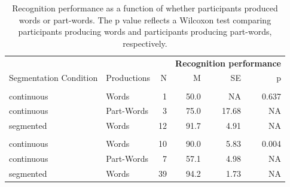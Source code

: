 \documentclass[
]{article}
\begin{document}
\begin{longtable}[t]{llrrrr}
\caption{\label{tab:correlation-recognition-vs-recall-discrete-print}Recognition performance as a function of whether participants produced words or part-words. The p value reflects a Wilcoxon test comparing participants producing words and participants producing part-words, respectively.}\\
\toprule
\multicolumn{3}{c}{\textbf{ }} & \multicolumn{3}{c}{\textbf{Recognition performance}} \\
\cmidrule(l{3pt}r{3pt}){4-6}
Segmentation Condition & Productions & N & M & SE & p\\
\midrule
\addlinespace[0.3em]
\multicolumn{6}{l}{\textbf{lab-based}}\\
\hspace{1em}continuous & Words & 1 & 50.0 & NA & 0.637\\
\hspace{1em}continuous & Part-Words & 3 & 75.0 & 17.68 & NA\\
\hspace{1em}segmented & Words & 12 & 91.7 & 4.91 & NA\\
\addlinespace[0.3em]
\multicolumn{6}{l}{\textbf{online}}\\
\hspace{1em}continuous & Words & 10 & 90.0 & 5.83 & 0.004\\
\hspace{1em}continuous & Part-Words & 7 & 57.1 & 4.98 & NA\\
\hspace{1em}segmented & Words & 39 & 94.2 & 1.73 & NA\\
\bottomrule
\end{longtable}
\end{document}
